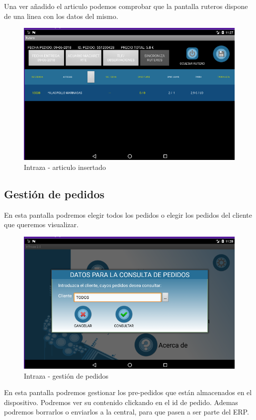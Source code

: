 \pagebreak
Una ver añadido el articulo podemos comprobar que la pantalla ruteros dispone de una linea con los datos del mismo.

\begin{figure}[H]
	\centering
	\includegraphics[width=0.7\linewidth]{figuras/manual/p6}
	\caption{Intraza - articulo insertado}
	\label{fig:Itzp6}
\end{figure}

\subsection{Gestión de pedidos}

En esta pantalla podremos elegir todos los pedidos o elegir los pedidos del cliente que queremos visualizar.

\begin{figure}[H]
	\centering
	\includegraphics[width=0.7\linewidth]{figuras/manual/p7}
	\caption{Intraza - gestión de pedidos}
	\label{fig:Itzp7}
\end{figure}

\pagebreak
En esta pantalla podremos gestionar los pre-pedidos que están almacenados en el dispositivo. Podremos ver su contenido clickando en el id de pedido. Ademas podremos borrarlos o enviarlos a la central, para que pasen a ser parte del ERP.

